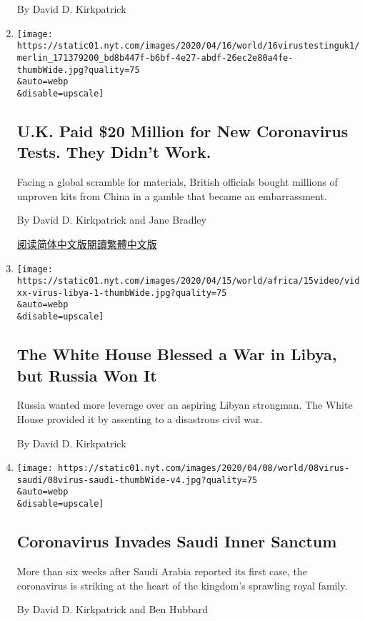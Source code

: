 \begin{enumerate}
  By David D. Kirkpatrick
\item
  \href{/2020/04/16/world/europe/coronavirus-antibody-test-uk.html}{}

  \texttt{[image: https://static01.nyt.com/images/2020/04/16/world/16virustestinguk1/merlin\_171379200\_bd8b447f-b6bf-4e27-abdf-26ec2e80a4fe-thumbWide.jpg?quality=75\\\&auto=webp\\\&disable=upscale]}

  \hypertarget{uk-paid-20-million-for-new-coronavirus-tests-they-didnt-work}{%
  \subsection{U.K. Paid \$20 Million for New Coronavirus Tests. They
  Didn't
  Work.}\label{uk-paid-20-million-for-new-coronavirus-tests-they-didnt-work}}

  Facing a global scramble for materials, British officials bought
  millions of unproven kits from China in a gamble that became an
  embarrassment.

  By David D. Kirkpatrick and Jane Bradley

  \href{https://cn.nytimes.com/world/20200417/coronavirus-antibody-test-uk/}{阅读简体中文版}\href{https://cn.nytimes.com/world/20200417/coronavirus-antibody-test-uk/zh-hant/}{閱讀繁體中文版}
\item
  \href{/2020/04/14/world/middleeast/libya-russia-john-bolton.html}{}

  \texttt{[image: https://static01.nyt.com/images/2020/04/15/world/africa/15video/vidxx-virus-libya-1-thumbWide.jpg?quality=75\\\&auto=webp\\\&disable=upscale]}

  \hypertarget{the-white-house-blessed-a-war-in-libya-but-russia-won-it}{%
  \subsection{The White House Blessed a War in Libya, but Russia Won
  It}\label{the-white-house-blessed-a-war-in-libya-but-russia-won-it}}

  Russia wanted more leverage over an aspiring Libyan strongman. The
  White House provided it by assenting to a disastrous civil war.

  By David D. Kirkpatrick
\item
  \href{/2020/04/08/world/middleeast/coronavirus-saudi-royal-infections.html}{}

  \texttt{[image: https://static01.nyt.com/images/2020/04/08/world/08virus-saudi/08virus-saudi-thumbWide-v4.jpg?quality=75\\\&auto=webp\\\&disable=upscale]}

  \hypertarget{coronavirus-invades-saudi-inner-sanctum}{%
  \subsection{Coronavirus Invades Saudi Inner
  Sanctum}\label{coronavirus-invades-saudi-inner-sanctum}}

  More than six weeks after Saudi Arabia reported its first case, the
  coronavirus is striking at the heart of the kingdom's sprawling royal
  family.

  By David D. Kirkpatrick and Ben Hubbard
\end{enumerate}

